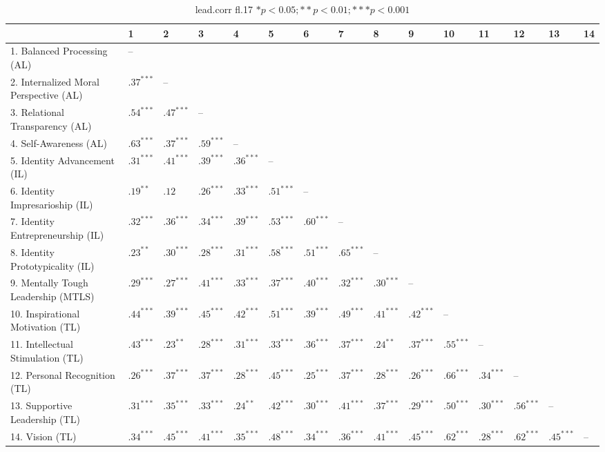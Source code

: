 \begin{table}[ht]
\centering
\begin{tabular}{lllllllllllllll}
  \hline
 & 1 & 2 & 3 & 4 & 5 & 6 & 7 & 8 & 9 & 10 & 11 & 12 & 13 & 14 \\ 
  \hline
1. Balanced Processing (AL) & -- &  &  &  &  &  &  &  &  &  &  &  &  &  \\ 
  2. Internalized Moral Perspective (AL) & $.37^{***}$ & -- &  &  &  &  &  &  &  &  &  &  &  &  \\ 
  3. Relational Transparency (AL) & $.54^{***}$ & $.47^{***}$ & -- &  &  &  &  &  &  &  &  &  &  &  \\ 
  4. Self-Awareness (AL) & $.63^{***}$ & $.37^{***}$ & $.59^{***}$ & -- &  &  &  &  &  &  &  &  &  &  \\ 
  5. Identity Advancement (IL) & $.31^{***}$ & $.41^{***}$ & $.39^{***}$ & $.36^{***}$ & -- &  &  &  &  &  &  &  &  &  \\ 
  6. Identity Impresarioship (IL) & $.19^{**}$ & $.12$ & $.26^{***}$ & $.33^{***}$ & $.51^{***}$ & -- &  &  &  &  &  &  &  &  \\ 
  7. Identity Entrepreneurship (IL) & $.32^{***}$ & $.36^{***}$ & $.34^{***}$ & $.39^{***}$ & $.53^{***}$ & $.60^{***}$ & -- &  &  &  &  &  &  &  \\ 
  8. Identity Prototypicality (IL) & $.23^{**}$ & $.30^{***}$ & $.28^{***}$ & $.31^{***}$ & $.58^{***}$ & $.51^{***}$ & $.65^{***}$ & -- &  &  &  &  &  &  \\ 
  9. Mentally Tough Leadership (MTLS) & $.29^{***}$ & $.27^{***}$ & $.41^{***}$ & $.33^{***}$ & $.37^{***}$ & $.40^{***}$ & $.32^{***}$ & $.30^{***}$ & -- &  &  &  &  &  \\ 
  10. Inspirational Motivation (TL) & $.44^{***}$ & $.39^{***}$ & $.45^{***}$ & $.42^{***}$ & $.51^{***}$ & $.39^{***}$ & $.49^{***}$ & $.41^{***}$ & $.42^{***}$ & -- &  &  &  &  \\ 
  11. Intellectual Stimulation (TL) & $.43^{***}$ & $.23^{**}$ & $.28^{***}$ & $.31^{***}$ & $.33^{***}$ & $.36^{***}$ & $.37^{***}$ & $.24^{**}$ & $.37^{***}$ & $.55^{***}$ & -- &  &  &  \\ 
  12. Personal Recognition (TL) & $.26^{***}$ & $.37^{***}$ & $.37^{***}$ & $.28^{***}$ & $.45^{***}$ & $.25^{***}$ & $.37^{***}$ & $.28^{***}$ & $.26^{***}$ & $.66^{***}$ & $.34^{***}$ & -- &  &  \\ 
  13. Supportive Leadership (TL) & $.31^{***}$ & $.35^{***}$ & $.33^{***}$ & $.24^{**}$ & $.42^{***}$ & $.30^{***}$ & $.41^{***}$ & $.37^{***}$ & $.29^{***}$ & $.50^{***}$ & $.30^{***}$ & $.56^{***}$ & -- &  \\ 
  14. Vision (TL) & $.34^{***}$ & $.45^{***}$ & $.41^{***}$ & $.35^{***}$ & $.48^{***}$ & $.34^{***}$ & $.36^{***}$ & $.41^{***}$ & $.45^{***}$ & $.62^{***}$ & $.28^{***}$ & $.62^{***}$ & $.45^{***}$ & -- \\ 
   \hline
\end{tabular}
\caption{lead.corr fl.17 $* p < 0.05; ** p < 0.01; *** p < 0.001$} 
\label{freq_corr.lead.corr.fl.17}
\end{table}
